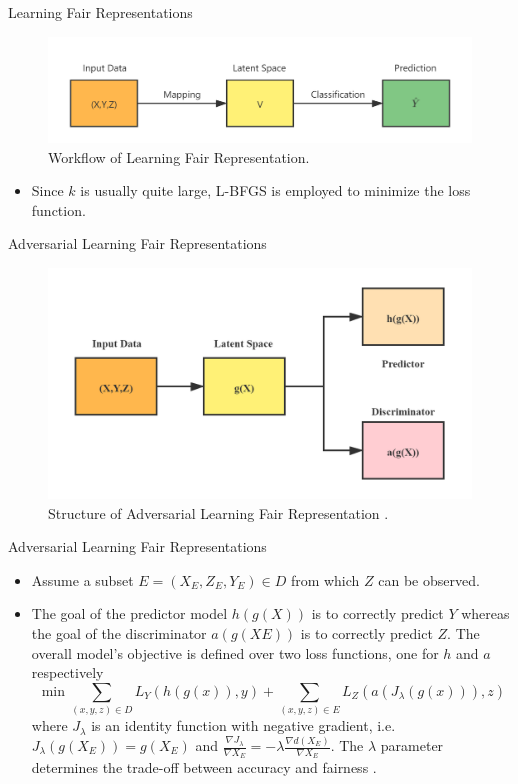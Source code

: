 \documentclass[10pt, xcolor=table,aspectratio=169]{beamer}
\begin{document}
\begin{frame}{Learning Fair Representations}
	\begin{figure}[t]
		\begin{center}
			\includegraphics[width=0.8\columnwidth]{./figs/LRF.png}
		\end{center}
		\caption{Workflow of Learning Fair Representation.}
	\end{figure}
	\begin{itemize}
		\item Since $k$ is usually quite large, L-BFGS is employed to minimize the loss function.
	\end{itemize}
\end{frame}

\begin{frame}{Adversarial Learning Fair Representations}
	\begin{figure}[t]
		\begin{center}
			\includegraphics[width=0.6\columnwidth]{./figs/ALRF.png}
		\end{center}
		\caption{Structure of Adversarial  Learning Fair Representation \cite{beutel2017data}.}
	\end{figure}
\end{frame}

\begin{frame}{Adversarial Learning Fair Representations}
	\begin{itemize}
		\item Assume a subset $E=(X_E, Z_E, Y_E)\in D$ from which $Z$ can be observed.
		\item The goal of the predictor model $h(g(X))$ is to correctly predict $Y$ whereas the
		      goal of the discriminator $a(g(XE))$ is to correctly predict $Z$. The overall model’s objective is defined over two loss functions, one for $h$ and $a$ respectively
		      \[\min \sum_{(x,y,z)\in D} L_Y(h(g(x)),y)+\sum_{(x,y,z)\in E} L_Z(a(J_\lambda (g(x))),z)\]
		      where $J_\lambda$ is an identity function with negative gradient, i.e. $J_\lambda(g(X_E))=g(X_E)$ and $\frac{\nabla J_\lambda}{\nabla X_E}=-\lambda \frac{\nabla d(X_E)}{\nabla X_E}$. The $\lambda$ parameter determines the trade-off between accuracy and fairness .
	\end{itemize}
\end{frame}
\end{document}
